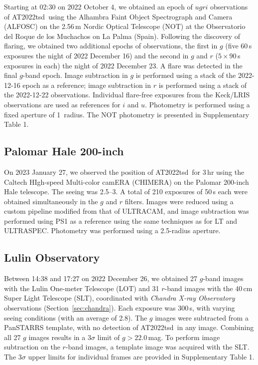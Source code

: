 \documentclass{nature_plusfigure}
\newcommand{\at}{AT2022tsd}
\begin{document}
\begin{methods}
Starting at 02:30 on 2022 October 4, we obtained an epoch of $ugri$ observations of \at\ using the Alhambra Faint Object Spectrograph and Camera (ALFOSC) on the 2.56\,m Nordic Optical Telescope (NOT) at the Observatorio del Roque de los Muchachos on La Palma (Spain). Following the discovery of flaring, we obtained two additional epochs of observations, the first in $g$ (five 60\,s exposures the night of 2022 December 16) and the second in $g$ and $r$ ($5 \times 90$\,s exposures in each) the night of 2022 December 23. A flare was detected in the final $g$-band epoch.  Image subtraction in $g$ is performed using a stack of the 2022-12-16 epoch as a reference; image subtraction in $r$ is performed using a stack of the 2022-12-22 observations.  Individual flare-free exposures from the Keck/LRIS observations are used as references for $i$ and $u$.  Photometry is performed using a fixed aperture of 1\arcsec\ radius.
The NOT photometry is presented in Supplementary Table 1.

\subsection{Palomar Hale 200-inch}
\label{sec:chimera}

On 2023 January 27, we observed the position of \at\ for 3\,hr using the Caltech HIgh-speed Multi-color camERA (CHIMERA\cite{Harding2016}) on the Palomar 200-inch Hale telescope. The seeing was 2.5--3\arcsec.
A total of 210 exposures of 50\,s each were obtained simultaneously in the $g$ and $r$ filters. Images were reduced using a custom pipeline modified from that of ULTRACAM\cite{Dhillon2007}, and image subtraction was performed using PS1 as a reference using the same techniques as for LT and ULTRASPEC. Photometry was performed using a 2.5\arcsec-radius aperture.

\subsection{Lulin Observatory}
\label{sec:lulin}

Between 14:38 and 17:27 on 2022 December 26, we obtained 
27 $g$-band images with the Lulin One-meter Telescope (LOT) and 31 $r$-band images with the 40\,cm Super Light Telescope (SLT), coordinated with {\it Chandra X-ray Observatory} observations (Section~\ref{sec:chandra}). Each exposure was 300\,s, with varying seeing conditions (with an average of 2.8\arcsec). The $g$ images were subtracted from a PanSTARRS template, with no detection of \at\ in any image.
Combining all 27 $g$ images results in a 3$\sigma$ limit of $g>22.0$\,mag.
To perform image subtraction on the $r$-band images, a template image was acquired with the SLT.
The 3$\sigma$ upper limits for individual frames are provided in Supplementary Table 1.


\end{methods}
\end{document}
